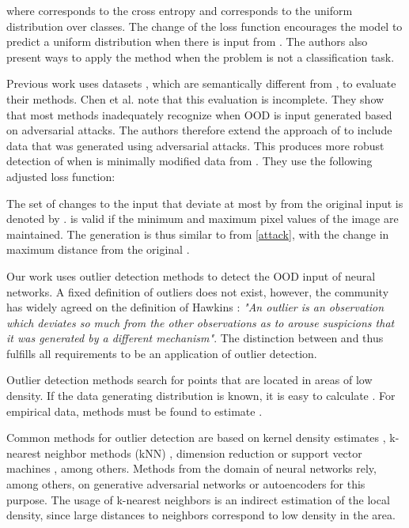\documentclass{article}
\begin{document}
where  corresponds to the cross entropy and  corresponds to the uniform distribution over  classes. The change of the loss function encourages the model to predict a uniform distribution when there is input from . The authors also present ways to apply the method when the problem is not a classification task.

Previous work uses datasets , which are semantically different from , to evaluate their methods. Chen et al. \cite{Chen.21.03.2020} note that this evaluation is incomplete. They show that most methods inadequately recognize when OOD is input generated based on adversarial attacks. The authors therefore extend the approach of \cite{Hendrycks.2018} to include data that was generated using adversarial attacks. This produces more robust detection of  when  is minimally modified data from . They use the following adjusted loss function:



The set of changes to the input that deviate at most by  from the original input is denoted by .  is valid if the minimum and maximum pixel values of the image are maintained. The generation is thus similar to  from \eqref{attack}, with the change in maximum distance from the original .

Our work uses outlier detection methods to detect the OOD input of neural networks. A fixed definition of outliers does not exist, however, the community has widely agreed on the definition of Hawkins \cite{.hawkins}: \textit{"An outlier is an observation which deviates so much from the other observations as to arouse suspicions that it was generated by a different mechanism"}. The distinction between  and  thus fulfills all requirements to be an application of outlier detection.

Outlier detection methods search for points that are located in areas of low density. If the data generating distribution is known, it is easy to calculate . For empirical data, methods must be found to estimate .

Common methods for outlier detection are based on kernel density estimates \cite{JooSeukKim.2008, LonginJanLatecki.2007, Schubert.2014}, k-nearest neighbor methods (kNN) \cite{FabrizioAngiulli.2002, Schubert.2014}, dimension reduction \cite{Xu.2010, Hoffmann.2007} or support vector machines \cite{.1999, Tax.2004}, among others.  Methods from the domain of neural networks rely, among others, on generative adversarial networks \cite{Schlegl.17.03.2017, Zenati.17.02.2018} or autoencoders \cite{Chen.2017, Zhou.2017} for this purpose. The usage of k-nearest neighbors is an indirect estimation of the local density, since large distances to neighbors correspond to low density in the area.
\end{document}
